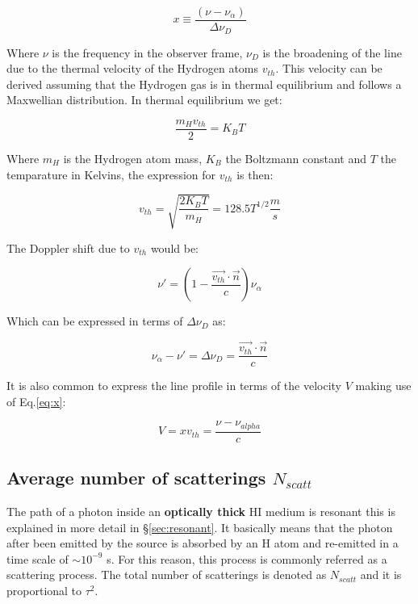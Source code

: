 \begin{equation}\label{eq:x}
x   \equiv \dfrac{(\nu -\nu_{\alpha})}{\Delta \nu_D}
\end{equation}

Where $\nu$ is the frequency in the observer frame,
$\nu_D$ is the broadening of the line due to the thermal
velocity of the Hydrogen atoms $v_{th}$. This velocity can be derived
assuming that the Hydrogen gas is in thermal equilibrium
and follows a Maxwellian distribution. In thermal equilibrium
we get:

\begin{equation}
\dfrac{m_H v_{th}}{2} = K_B T 
\end{equation}

Where $m_H$ is the Hydrogen atom mass, $K_B$ the Boltzmann constant and $T$
the temparature in Kelvins, the expression for $v_{th}$ is then:

\begin{equation}
v_{th} = \sqrt{\dfrac{2 K_B T}{m_H}} = 128.5 T^{1/2}\dfrac{m}{s}
\end{equation}

The Doppler shift due to $v_{th}$ would be:

\begin{equation}
\nu'= (1 - \dfrac{\vec{v_{th}}\cdot\vec{n}}{c})\nu_{\alpha}
\end{equation}

Which can be expressed in terms of $\Delta \nu_D$ as:

\begin{equation}
\nu_{\alpha} - \nu' = \Delta\nu_D =  \dfrac{\vec{v_{th}}\cdot\vec{n}}{c}
\end{equation}

It is also common to express the line profile in terms of the velocity $V$
making use of Eq.\ref{eq:x}:

\begin{equation}
V = xv_{th} = \dfrac{\nu - \nu_{alpha}}c
\end{equation}

\subsection{Average number of scatterings $N_{scatt}$}

The path of a \ly photon inside an {\bf{optically thick}}
HI medium is resonant this is explained in more detail 
in \S \ref{sec:resonant}. It basically means that the \ly photon
after been emitted by the source is absorbed by an H atom
and re-emitted in a time scale of $\sim 10^{-9}$ s.
For this reason, this process is commonly referred as
a scattering process. The total number of scatterings
is denoted as $N_{scatt}$ and it is proportional to
$\tau^2$.



